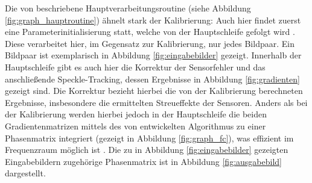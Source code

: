 Die von \citeauthor{Ber15} beschriebene Hauptverarbeitungsroutine (siehe Abbildung \ref{fig:graph_hauptroutine}) ähnelt stark der Kalibrierung: Auch hier findet zuerst eine Parameterinitialisierung statt, welche von der Hauptschleife gefolgt wird . Diese verarbeitet hier, im Gegensatz zur Kalibrierung, nur jedes Bildpaar. Ein Bildpaar ist exemplarisch in Abbildung \ref{fig:eingabebilder} gezeigt. Innerhalb der Hauptschleife gibt es auch hier die Korrektur der Sensorfehler und das anschließende Speckle-Tracking, dessen Ergebnisse in Abbildung \ref{fig:gradienten} gezeigt sind. Die Korrektur bezieht hierbei die von der Kalibrierung berechneten Ergebnisse, insbesondere die ermittelten Streueffekte der Sensoren. Anders als bei der Kalibrierung werden hierbei jedoch in der Hauptschleife die beiden Gradientenmatrizen mittels des von \citeauthor{FC88} entwickelten Algorithmus zu einer Phasenmatrix integriert (gezeigt in Abbildung \ref{fig:graph_fc}), was effizient im Frequenzraum möglich ist \cite{FC88}. Die zu in Abbildung \ref{fig:eingabebilder} gezeigten Eingabebildern zugehörige Phasenmatrix ist in Abbildung \ref{fig:ausgabebild} dargestellt. 

